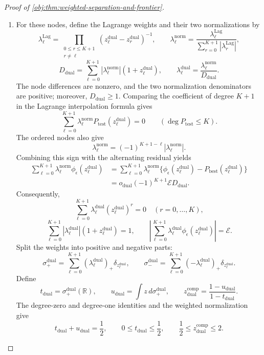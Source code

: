 \documentclass[11pt]{article}
\begin{document}
\begin{proof}[Proof of \cref{obj:thm:weighted-separation-and-frontier}]
\begin{enumerate}
\item
For these nodes, define the Lagrange weights and their two normalizations by
\[
\lambda_\ell^{\mathrm{Lag}}
=\prod_{\substack{0\le r\le K+1\\r\ne\ell}}
(z_\ell^{\mathrm{dual}}-z_r^{\mathrm{dual}})^{-1},
\qquad
\lambda_\ell^{\mathrm{norm}}
=\frac{\lambda_\ell^{\mathrm{Lag}}}
       {\sum_{r=0}^{K+1}|\lambda_r^{\mathrm{Lag}}|},
\]
\[
D_{\mathrm{dual}}
=\sum_{\ell=0}^{K+1}
|\lambda_\ell^{\mathrm{norm}}|(1+z_\ell^{\mathrm{dual}}),
\qquad
\lambda_\ell^{\mathrm{dual}}
=\frac{\lambda_\ell^{\mathrm{norm}}}{D_{\mathrm{dual}}}.
\]
The node differences are nonzero, and the two normalization denominators are positive; moreover, \(D_{\mathrm{dual}}\ge1\).
Comparing the coefficient of degree \(K+1\) in the Lagrange interpolation formula gives
\[
\sum_{\ell=0}^{K+1}
\lambda_\ell^{\mathrm{norm}}P_{\mathrm{test}}(z_\ell^{\mathrm{dual}})
=0
\qquad(\deg P_{\mathrm{test}}\le K).
\]
The ordered nodes also give
\[
\lambda_\ell^{\mathrm{norm}}
=(-1)^{K+1-\ell}|\lambda_\ell^{\mathrm{norm}}|.
\]
Combining this sign with the alternating residual yields
\[
\begin{aligned}
\sum_{\ell=0}^{K+1}
\lambda_\ell^{\mathrm{norm}}\phi_\epsilon(z_\ell^{\mathrm{dual}})
&=
\sum_{\ell=0}^{K+1}
\lambda_\ell^{\mathrm{norm}}
\{\phi_\epsilon(z_\ell^{\mathrm{dual}})
-P_{\mathrm{best}}(z_\ell^{\mathrm{dual}})\}\\
&=o_{\mathrm{dual}}(-1)^{K+1}\mathcal E D_{\mathrm{dual}}.
\end{aligned}
\]
Consequently,
\[
\sum_{\ell=0}^{K+1}
\lambda_\ell^{\mathrm{dual}}(z_\ell^{\mathrm{dual}})^r=0
\quad(r=0,\ldots,K),
\]
\[
\sum_{\ell=0}^{K+1}
|\lambda_\ell^{\mathrm{dual}}|(1+z_\ell^{\mathrm{dual}})=1,
\qquad
\left|
\sum_{\ell=0}^{K+1}
\lambda_\ell^{\mathrm{dual}}\phi_\epsilon(z_\ell^{\mathrm{dual}})
\right|=\mathcal E.
\]
Split the weights into positive and negative parts:
\[
\sigma_+^{\mathrm{dual}}
=\sum_{\ell=0}^{K+1}(\lambda_\ell^{\mathrm{dual}})_+
 \delta_{z_\ell^{\mathrm{dual}}},
\qquad
\sigma_-^{\mathrm{dual}}
=\sum_{\ell=0}^{K+1}(-\lambda_\ell^{\mathrm{dual}})_+
 \delta_{z_\ell^{\mathrm{dual}}}.
\]
Define
\[
t_{\mathrm{dual}}=\sigma_+^{\mathrm{dual}}(\mathbb R),
\qquad
u_{\mathrm{dual}}=\int z\,d\sigma_+^{\mathrm{dual}},
\qquad
z_{\mathrm{dual}}^{\mathrm{comp}}
=\frac{1-u_{\mathrm{dual}}}{1-t_{\mathrm{dual}}}.
\]
The degree-zero and degree-one identities and the weighted normalization give
\[
t_{\mathrm{dual}}+u_{\mathrm{dual}}=\frac12,
\qquad
0\le t_{\mathrm{dual}}\le\frac12,
\qquad
\frac12\le z_{\mathrm{dual}}^{\mathrm{comp}}\le2.
\]
\end{enumerate}
\end{proof}
\end{document}
